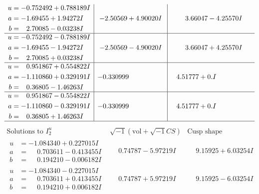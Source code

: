 \documentclass[1p]{elsarticle_modified}
\theoremstyle{definition}
\newcommand{\I}{\sqrt{-1}}
\begin{document}
$$\begin{array}{c|c|c}
\begin{aligned}
u &= -0.752492 + 0.788189 I \\
a &= -1.69455 + 1.94272 I \\
b &= \phantom{-}2.70085 - 0.03238 I\end{aligned}
 & -2.50569 + 4.90020 I & \phantom{-}3.66047 - 4.25570 I \\ \hline\begin{aligned}
u &= -0.752492 - 0.788189 I \\
a &= -1.69455 - 1.94272 I \\
b &= \phantom{-}2.70085 + 0.03238 I\end{aligned}
 & -2.50569 - 4.90020 I & \phantom{-}3.66047 + 4.25570 I \\ \hline\begin{aligned}
u &= \phantom{-}0.951867 + 0.554822 I \\
a &= -1.110860 + 0.329191 I \\
b &= \phantom{-}0.36805 - 1.46263 I\end{aligned}
 & -0.330999\phantom{ +0.000000I} & \phantom{-}4.51777 + 0. I\phantom{ +0.000000I} \\ \hline\begin{aligned}
u &= \phantom{-}0.951867 - 0.554822 I \\
a &= -1.110860 - 0.329191 I \\
b &= \phantom{-}0.36805 + 1.46263 I\end{aligned}
 & -0.330999\phantom{ +0.000000I} & \phantom{-}4.51777 + 0. I\phantom{ +0.000000I}\\
 \hline 
 \end{array}$$\newpage$$\begin{array}{c|c|c}  
\text{Solutions to }I^u_{2}& \I (\text{vol} + \sqrt{-1}CS) & \text{Cusp shape}\\
 \hline 
\begin{aligned}
u &= -1.084340 + 0.227015 I \\
a &= \phantom{-}0.703611 - 0.413455 I \\
b &= \phantom{-}0.194210 - 0.006182 I\end{aligned}
 & \phantom{-}0.74787 - 5.97219 I & \phantom{-}9.15925 + 6.03254 I \\ \hline\begin{aligned}
u &= -1.084340 - 0.227015 I \\
a &= \phantom{-}0.703611 + 0.413455 I \\
b &= \phantom{-}0.194210 + 0.006182 I\end{aligned}
 & \phantom{-}0.74787 + 5.97219 I & \phantom{-}9.15925 - 6.03254 I \\ \hline\begin{aligned}

\end{aligned}
\end{array}$$
\end{document}
